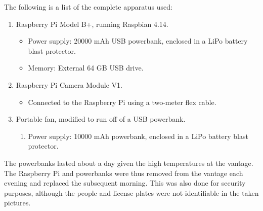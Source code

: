 \documentclass[a4paper, 11pt]{article} %
\begin{document}
		The following is a list of the complete apparatus used:
		\begin{enumerate}
			\item Raspberry Pi Model B+, running Raspbian 4.14.
			\begin{itemize}
				\item[] Power supply: 20000 mAh USB powerbank, enclosed in a LiPo battery blast protector.
				\item[] Memory: External 64 GB USB drive.
			\end{itemize}
			\item Raspberry Pi Camera Module V1.
			\begin{itemize}
				\item[] Connected to the Raspberry Pi using a two-meter flex cable.
			\end{itemize}
			\item Portable fan, modified to run off of a USB powerbank.
			\begin{enumerate}
				\item[] Power supply: 10000 mAh powerbank, enclosed in a LiPo battery blast protector.
			\end{enumerate}
		\end{enumerate}
		The powerbanks lasted about a day given the high temperatures at the vantage. The Raspberry Pi 
		and powerbanks were thus removed from the vantage each evening and replaced the subsequent 
		morning. This was also done for security purposes, although the people and license plates were not 
		identifiable in the taken pictures.
	
\end{document}
